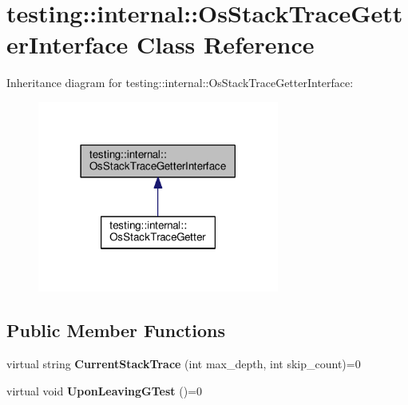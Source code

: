 \hypertarget{classtesting_1_1internal_1_1OsStackTraceGetterInterface}{}\section{testing\+:\+:internal\+:\+:Os\+Stack\+Trace\+Getter\+Interface Class Reference}
\label{classtesting_1_1internal_1_1OsStackTraceGetterInterface}


Inheritance diagram for testing\+:\+:internal\+:\+:Os\+Stack\+Trace\+Getter\+Interface\+:\nopagebreak
\begin{figure}[H]
\begin{center}
\leavevmode
\includegraphics[width=225pt]{classtesting_1_1internal_1_1OsStackTraceGetterInterface__inherit__graph}
\end{center}
\end{figure}
\subsection*{Public Member Functions}
\begin{DoxyCompactItemize}
\item 
virtual string {\bfseries Current\+Stack\+Trace} (int max\+\_\+depth, int skip\+\_\+count)=0\hypertarget{classtesting_1_1internal_1_1OsStackTraceGetterInterface_a6965eadb9b340808718fab9f1475c49a}{}\label{classtesting_1_1internal_1_1OsStackTraceGetterInterface_a6965eadb9b340808718fab9f1475c49a}

\item 
virtual void {\bfseries Upon\+Leaving\+G\+Test} ()=0\hypertarget{classtesting_1_1internal_1_1OsStackTraceGetterInterface_a791bd120428b5a53d5eeba1b27296a39}{}\label{classtesting_1_1internal_1_1OsStackTraceGetterInterface_a791bd120428b5a53d5eeba1b27296a39}

\end{DoxyCompactItemize}
